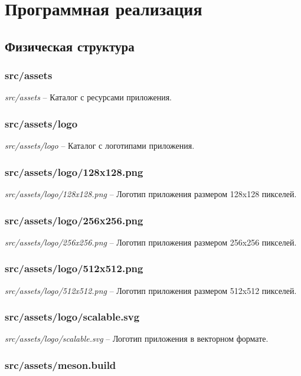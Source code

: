 
\chapter{Программная реализация}

\section{Физическая структура}

\subsection{src/assets}

\textit{src/assets} -- Каталог с ресурсами приложения.

\subsection{src/assets/logo}

\textit{src/assets/logo} -- Каталог с логотипами приложения.

\subsection{src/assets/logo/128x128.png}

\textit{src/assets/logo/128x128.png} -- Логотип приложения размером 128x128
пикселей.

\subsection{src/assets/logo/256x256.png}

\textit{src/assets/logo/256x256.png} -- Логотип приложения размером 256x256
пикселей.

\subsection{src/assets/logo/512x512.png}

\textit{src/assets/logo/512x512.png} -- Логотип приложения размером 512x512
пикселей.

\subsection{src/assets/logo/scalable.svg}

\textit{src/assets/logo/scalable.svg} -- Логотип приложения в векторном формате.

\subsection{src/assets/meson.build}

